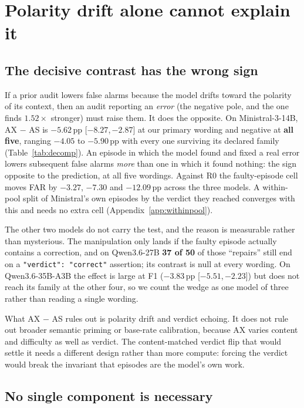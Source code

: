 \documentclass[11pt]{article}
\newcommand{\pp}{\,\text{pp}}
\newcommand{\ci}[2]{{\footnotesize[$#1$,\,$#2$]}}
\begin{document}
\section{Polarity drift alone cannot explain it}
\label{sec:wedge}

\subsection{The decisive contrast has the wrong sign}

If a prior audit lowers false alarms because the model drifts toward the polarity of its context, then
an audit reporting an \emph{error} (the negative pole, and the one \citet{temkit2026} finds
$1.52\times$ stronger) must raise them. It does the opposite. On Ministral-3-14B, AX $-$ AS is
$-5.62\pp$ \ci{-8.27}{-2.87} at our primary wording and negative at \textbf{all five}, ranging $-4.05$
to $-5.90\pp$ with every one surviving its declared family (Table~\ref{tab:decomp}). An episode in
which the model found and fixed a real error lowers subsequent false alarms \emph{more} than one in
which it found nothing: the sign opposite to the prediction, at all five wordings. Against R0
the faulty-episode cell moves FAR by $-3.27$, $-7.30$ and $-12.09\pp$ across the three models. A
within-pool split of Ministral's own episodes by the verdict they reached converges with this and needs
no extra cell (Appendix~\ref{app:withinpool}).

The other two models do not carry the test, and the reason is measurable rather than mysterious. The
manipulation only lands if the faulty episode actually contains a correction, and on Qwen3.6-27B
\textbf{37 of 50} of those ``repairs'' still end on a \texttt{"verdict": "correct"} assertion; its
contrast is null at every wording. On Qwen3.6-35B-A3B the effect is large at F1 ($-3.83\pp$
\ci{-5.51}{-2.23}) but does not reach its family at the other four, so we count the wedge as one model
of three rather than reading a single wording.

What AX $-$ AS rules out is polarity drift and verdict echoing. It does not rule out broader semantic
priming or base-rate calibration, because AX varies content and difficulty as well as verdict. The
content-matched verdict flip that would settle it needs a different design rather than more compute:
forcing the verdict would break the invariant that episodes are the model's own work.



\subsection{No single component is necessary}
\end{document}
